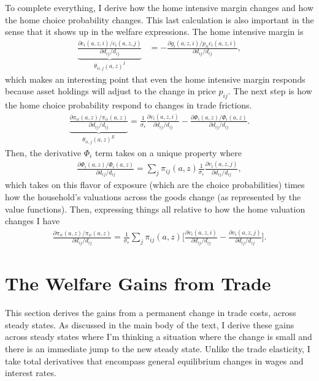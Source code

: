 \documentclass[12pt,pdftex]{article}
\begin{document}
\begin{onehalfspacing}
To complete everything, I derive how the home intensive margin changes and how the home choice probability changes. This last calculation is also important in the sense that it shows up in the welfare expressions. The home intensive margin is
\begin{align}
\underbrace{\frac{\partial c_{i}(a,z,i)/ c_{i}(a,z,j)}{\partial d_{ij} / d_{ij}}}_{\theta_{ii,j}(a,z)^{I}} &= -\frac{\partial g_{i}(a,z,i)/ p_{ii}c_{i}(a,z,i)}{\partial d_{ij}/ d_{ij}},
\end{align}
which makes an interesting point that even the home intensive margin responds because asset holdings will adjust to the change in price $p_{ij}$. The next step is how the home choice probability respond to changes in trade frictions.
\begin{align}
\underbrace{\frac{\partial \pi_{ii}(a,z) / \pi_{ii}(a,z) }{\partial d_{ij} / d_{ij}}}_{\theta_{ii,j}(a,z)^{E}} = \frac{1}{\sigma_{\epsilon}}\frac{\partial v_{i}(a,z,i)}{\partial d_{ij}/d_{ij}} - \frac{\partial \Phi_{i}(a,z) / \Phi_{i}(a,z)}{\partial d_{ij}/d_{ij}}.
\end{align}
Then, the derivative $\Phi_{i}$ term takes on a unique property where
\begin{align}
\frac{\partial \Phi_{i}(a,z) / \Phi_{i}(a,z)}{\partial d_{ij}/d_{ij}} = \sum_{j} \pi_{ij}(a,z) \frac{1}{\sigma_{\epsilon}}\frac{\partial v_{i}(a,z,j)}{\partial d_{ij}/d_{ij}},
\end{align}
which takes on this flavor of exposure (which are the choice probabilities) times how the household's valuations across the goods change (as represented by the value functions). Then, expressing things all relative to how the home valuation changes I have
\begin{align}
\frac{\partial \pi_{ii}(a,z) / \pi_{ii}(a,z) }{\partial d_{ij} / d_{ij}} = \frac{1}{\sigma_{\epsilon}} \sum_{j} \pi_{ij}(a,z) \bigg[ \frac{\partial v_{i}(a,z,i)}{\partial d_{ij}/d_{ij}} - \frac{\partial v_{i}(a,z,j)}{\partial d_{ij}/d_{ij}} \bigg].
\label{eq:apx-change-home-choice}
\end{align}

\section{The Welfare Gains from Trade}\label{apx-sec:gains-trade}


This section derives the gains from a permanent change in trade costs, across steady states. As discussed in the main body of the text, I derive these gains across steady states where I'm thinking a situation where the change is small and there is an immediate jump to the new steady state.  Unlike the trade elasticity, I take total derivatives that encompass general equilibrium changes in wages and interest rates.


\end{onehalfspacing}
\end{document}
